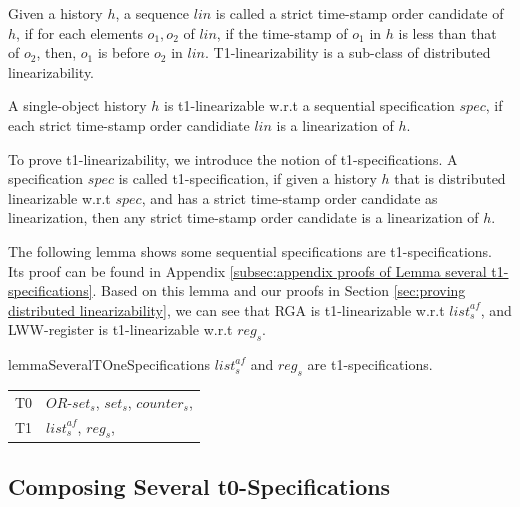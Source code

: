 Given a history $h$, a sequence $\mathit{lin}$ is called a strict time-stamp order candidate of $h$, if for each elements $o_1,o_2$ of $\mathit{lin}$, if the time-stamp of $o_1$ in $h$ is less than that of $o_2$, then, $o_1$ is before $o_2$ in $\mathit{lin}$. T1-linearizability is a sub-class of distributed linearizability.

\begin{definition}[t1-linearizability]
\label{definition:t1-ilnearizability}
A single-object history $h$ is t1-linearizable w.r.t a sequential specification $\mathit{spec}$, if each strict time-stamp order candidiate $\mathit{lin}$ is a linearization of $h$. 
\end{definition} 

To prove t1-linearizability, we introduce the notion of t1-specifications. A specification $\mathit{spec}$ is called t1-specification, if given a history $h$ that is distributed linearizable w.r.t $\mathit{spec}$, and has a strict time-stamp order candidate as linearization, then any strict time-stamp order candidate is a linearization of $h$.

The following lemma shows some sequential specifications are t1-specifications. Its proof can be found in Appendix \ref{subsec:appendix proofs of Lemma several t1-specifications}. Based on this lemma and our proofs in Section \ref{sec:proving distributed linearizability}, we can see that RGA is t1-linearizable w.r.t $\mathit{list}_s^{\mathit{af}}$, and LWW-register is t1-linearizable w.r.t $\mathit{reg}_s$. 

\begin{restatable}{lemma}{SeveralTOneSpecifications}
\label{lemma:several t1-specifications}
$\mathit{list}_s^{\mathit{af}}$ and $\mathit{reg}_s$ are t1-specifications.
\end{restatable}


\begin{table}
  \centering
  \begin{tabular}[t]{l|l}
    T0 & $\mathit{OR}$-$\mathit{set}_s$, $\mathit{set}_s$, $\mathit{counter}_s$,  \\
    T1 & $\mathit{list}_s^{\mathit{af}}$, $\mathit{reg}_s$, 
  \end{tabular}
\end{table}




\subsection{Composing Several t0-Specifications}
\label{lemma:several t0-specifications can be composed}

